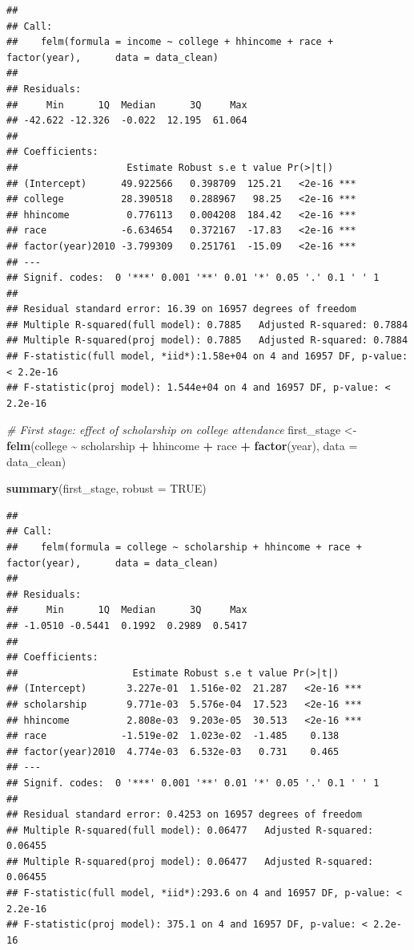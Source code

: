 \documentclass[
]{article}
\newenvironment{Shaded}{\begin{snugshade}}{\end{snugshade}}
\newcommand{\AttributeTok}[1]{\textcolor[rgb]{0.13,0.29,0.53}{#1}}
\newcommand{\CommentTok}[1]{\textcolor[rgb]{0.56,0.35,0.01}{\textit{#1}}}
\newcommand{\ConstantTok}[1]{\textcolor[rgb]{0.56,0.35,0.01}{#1}}
\newcommand{\FunctionTok}[1]{\textcolor[rgb]{0.13,0.29,0.53}{\textbf{#1}}}
\newcommand{\NormalTok}[1]{#1}
\newcommand{\OtherTok}[1]{\textcolor[rgb]{0.56,0.35,0.01}{#1}}
\newcommand{\SpecialCharTok}[1]{\textcolor[rgb]{0.81,0.36,0.00}{\textbf{#1}}}
\begin{document}
\begin{verbatim}
## 
## Call:
##    felm(formula = income ~ college + hhincome + race + factor(year),      data = data_clean) 
## 
## Residuals:
##     Min      1Q  Median      3Q     Max 
## -42.622 -12.326  -0.022  12.195  61.064 
## 
## Coefficients:
##                   Estimate Robust s.e t value Pr(>|t|)    
## (Intercept)      49.922566   0.398709  125.21   <2e-16 ***
## college          28.390518   0.288967   98.25   <2e-16 ***
## hhincome          0.776113   0.004208  184.42   <2e-16 ***
## race             -6.634654   0.372167  -17.83   <2e-16 ***
## factor(year)2010 -3.799309   0.251761  -15.09   <2e-16 ***
## ---
## Signif. codes:  0 '***' 0.001 '**' 0.01 '*' 0.05 '.' 0.1 ' ' 1
## 
## Residual standard error: 16.39 on 16957 degrees of freedom
## Multiple R-squared(full model): 0.7885   Adjusted R-squared: 0.7884 
## Multiple R-squared(proj model): 0.7885   Adjusted R-squared: 0.7884 
## F-statistic(full model, *iid*):1.58e+04 on 4 and 16957 DF, p-value: < 2.2e-16 
## F-statistic(proj model): 1.544e+04 on 4 and 16957 DF, p-value: < 2.2e-16
\end{verbatim}

\begin{Shaded}
\begin{Highlighting}[]
\CommentTok{\# First stage: effect of scholarship on college attendance}
\NormalTok{first\_stage }\OtherTok{\textless{}{-}} \FunctionTok{felm}\NormalTok{(college }\SpecialCharTok{\textasciitilde{}}\NormalTok{ scholarship }\SpecialCharTok{+}\NormalTok{ hhincome }\SpecialCharTok{+}\NormalTok{ race }\SpecialCharTok{+} \FunctionTok{factor}\NormalTok{(year),}
                    \AttributeTok{data =}\NormalTok{ data\_clean)}

\FunctionTok{summary}\NormalTok{(first\_stage, }\AttributeTok{robust =} \ConstantTok{TRUE}\NormalTok{)}
\end{Highlighting}
\end{Shaded}

\begin{verbatim}
## 
## Call:
##    felm(formula = college ~ scholarship + hhincome + race + factor(year),      data = data_clean) 
## 
## Residuals:
##     Min      1Q  Median      3Q     Max 
## -1.0510 -0.5441  0.1992  0.2989  0.5417 
## 
## Coefficients:
##                    Estimate Robust s.e t value Pr(>|t|)    
## (Intercept)       3.227e-01  1.516e-02  21.287   <2e-16 ***
## scholarship       9.771e-03  5.576e-04  17.523   <2e-16 ***
## hhincome          2.808e-03  9.203e-05  30.513   <2e-16 ***
## race             -1.519e-02  1.023e-02  -1.485    0.138    
## factor(year)2010  4.774e-03  6.532e-03   0.731    0.465    
## ---
## Signif. codes:  0 '***' 0.001 '**' 0.01 '*' 0.05 '.' 0.1 ' ' 1
## 
## Residual standard error: 0.4253 on 16957 degrees of freedom
## Multiple R-squared(full model): 0.06477   Adjusted R-squared: 0.06455 
## Multiple R-squared(proj model): 0.06477   Adjusted R-squared: 0.06455 
## F-statistic(full model, *iid*):293.6 on 4 and 16957 DF, p-value: < 2.2e-16 
## F-statistic(proj model): 375.1 on 4 and 16957 DF, p-value: < 2.2e-16
\end{verbatim}
\end{document}
